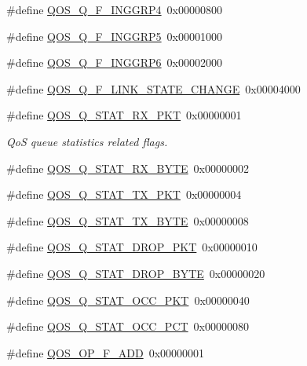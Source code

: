 \begin{DoxyCompactItemize}
\#define \hyperlink{group__FAPI__QOS__QUEUE_ga4f50900ef23e2fb31aeac3eb9932c8be}{Q\-O\-S\-\_\-\-Q\-\_\-\-F\-\_\-\-I\-N\-G\-G\-R\-P4}~0x00000800
\item 
\#define \hyperlink{group__FAPI__QOS__QUEUE_ga1ce6f7b2edbc2fb87b3e0bf2c2da231d}{Q\-O\-S\-\_\-\-Q\-\_\-\-F\-\_\-\-I\-N\-G\-G\-R\-P5}~0x00001000
\item 
\#define \hyperlink{group__FAPI__QOS__QUEUE_ga5046759dc7d0ebae110694a9be334def}{Q\-O\-S\-\_\-\-Q\-\_\-\-F\-\_\-\-I\-N\-G\-G\-R\-P6}~0x00002000
\item 
\#define \hyperlink{group__FAPI__QOS__QUEUE_ga30f059995ac6786208d944eb84f39fef}{Q\-O\-S\-\_\-\-Q\-\_\-\-F\-\_\-\-L\-I\-N\-K\-\_\-\-S\-T\-A\-T\-E\-\_\-\-C\-H\-A\-N\-G\-E}~0x00004000
\item 
\#define \hyperlink{group__FAPI__QOS__QUEUE_ga9a9a7fe4e0e98bd1a08c146a5ceea156}{Q\-O\-S\-\_\-\-Q\-\_\-\-S\-T\-A\-T\-\_\-\-R\-X\-\_\-\-P\-K\-T}~0x00000001
\begin{DoxyCompactList}\small\item\em Qo\-S queue statistics related flags. \end{DoxyCompactList}\item 
\#define \hyperlink{group__FAPI__QOS__QUEUE_ga1bc411916553d677f198bfe53a9d66e5}{Q\-O\-S\-\_\-\-Q\-\_\-\-S\-T\-A\-T\-\_\-\-R\-X\-\_\-\-B\-Y\-T\-E}~0x00000002
\item 
\#define \hyperlink{group__FAPI__QOS__QUEUE_gadb32e8befc0db998929b240570021e27}{Q\-O\-S\-\_\-\-Q\-\_\-\-S\-T\-A\-T\-\_\-\-T\-X\-\_\-\-P\-K\-T}~0x00000004
\item 
\#define \hyperlink{group__FAPI__QOS__QUEUE_gaae63033c6c8e70e7f6f44ffbcdfe2d98}{Q\-O\-S\-\_\-\-Q\-\_\-\-S\-T\-A\-T\-\_\-\-T\-X\-\_\-\-B\-Y\-T\-E}~0x00000008
\item 
\#define \hyperlink{group__FAPI__QOS__QUEUE_gad7742bbe991b93d5e2f2cb15f9368fd5}{Q\-O\-S\-\_\-\-Q\-\_\-\-S\-T\-A\-T\-\_\-\-D\-R\-O\-P\-\_\-\-P\-K\-T}~0x00000010
\item 
\#define \hyperlink{group__FAPI__QOS__QUEUE_ga823c7487863f66b69788ca8f7a6ae5bc}{Q\-O\-S\-\_\-\-Q\-\_\-\-S\-T\-A\-T\-\_\-\-D\-R\-O\-P\-\_\-\-B\-Y\-T\-E}~0x00000020
\item 
\#define \hyperlink{group__FAPI__QOS__QUEUE_ga039fef59e2d78c81c3208d48b592ca99}{Q\-O\-S\-\_\-\-Q\-\_\-\-S\-T\-A\-T\-\_\-\-O\-C\-C\-\_\-\-P\-K\-T}~0x00000040
\item 
\#define \hyperlink{group__FAPI__QOS__QUEUE_ga08bb5276a8019c599b5dabec03ca9ce3}{Q\-O\-S\-\_\-\-Q\-\_\-\-S\-T\-A\-T\-\_\-\-O\-C\-C\-\_\-\-P\-C\-T}~0x00000080
\item 
\hypertarget{group__FAPI__QOS__QUEUE_gaeb2dbdb4c944301060491384b675bb9c}{\#define \hyperlink{group__FAPI__QOS__QUEUE_gaeb2dbdb4c944301060491384b675bb9c}{Q\-O\-S\-\_\-\-O\-P\-\_\-\-F\-\_\-\-A\-D\-D}~0x00000001}\label{group__FAPI__QOS__QUEUE_gaeb2dbdb4c944301060491384b675bb9c}


\end{DoxyCompactItemize}
